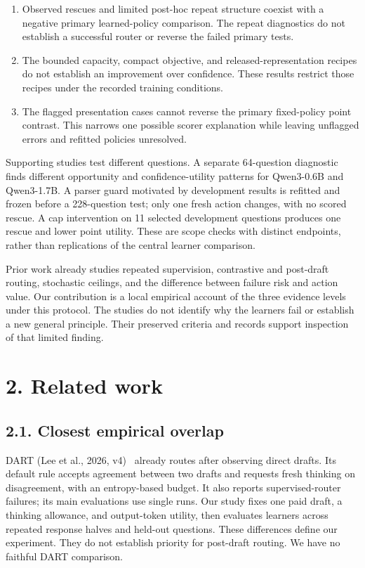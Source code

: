\documentclass[11pt,a4paper]{article}
\begin{document}
\begin{enumerate}
\item Observed rescues and limited post-hoc repeat structure coexist with a negative primary learned-policy comparison. The repeat diagnostics do not establish a successful router or reverse the failed primary tests.
\item The bounded capacity, compact objective, and released-representation recipes do not establish an improvement over confidence. These results restrict those recipes under the recorded training conditions.
\item The flagged presentation cases cannot reverse the primary fixed-policy point contrast. This narrows one possible scorer explanation while leaving unflagged errors and refitted policies unresolved.
\end{enumerate}
Supporting studies test different questions. A separate 64-question diagnostic finds different opportunity and confidence-utility patterns for Qwen3-0.6B and Qwen3-1.7B. A parser guard motivated by development results is refitted and frozen before a 228-question test; only one fresh action changes, with no scored rescue. A cap intervention on 11 selected development questions produces one rescue and lower point utility. These are scope checks with distinct endpoints, rather than replications of the central learner comparison.

Prior work already studies repeated supervision, contrastive and post-draft routing, stochastic ceilings, and the difference between failure risk and action value. Our contribution is a local empirical account of the three evidence levels under this protocol. The studies do not identify why the learners fail or establish a new general principle. Their preserved criteria and records support inspection of that limited finding.

\section*{2. Related work}\label{sec:2-related-work}
\subsection*{2.1. Closest empirical overlap}\label{sec:21-closest-empirical-overlap}
DART (Lee et al., 2026, v4)~\citep{lee2026dart} already routes after observing direct drafts. Its default rule accepts agreement between two drafts and requests fresh thinking on disagreement, with an entropy-based budget. It also reports supervised-router failures; its main evaluations use single runs. Our study fixes one paid draft, a thinking allowance, and output-token utility, then evaluates learners across repeated response halves and held-out questions. These differences define our experiment. They do not establish priority for post-draft routing. We have no faithful DART comparison.
\end{document}
